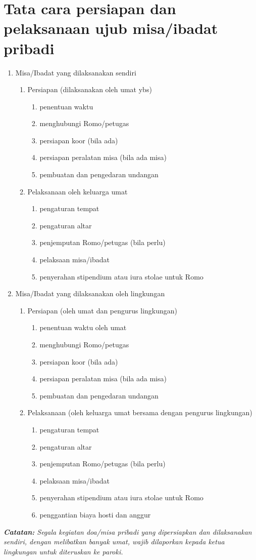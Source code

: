\section{Tata cara persiapan dan pelaksanaan ujub misa/ibadat pribadi}
\begin{enumerate}
\item Misa/Ibadat yang dilaksanakan sendiri
	\begin{enumerate}
	\item Persiapan (dilaksanakan oleh umat ybs)
			\begin{enumerate}
			\item penentuan waktu
			\item menghubungi Romo/petugas
			\item persiapan koor (bila ada)
			\item persiapan peralatan misa (bila ada misa)
			\item pembuatan dan pengedaran undangan
			\end{enumerate}
	\item Pelaksanaan oleh keluarga umat
			\begin{enumerate}
			\item pengaturan tempat
			\item pengaturan altar
			\item penjemputan Romo/petugas (bila perlu)
			\item pelaksaan misa/ibadat
			\item penyerahan stipendium atau iura stolae untuk Romo
			\end{enumerate}
	\end{enumerate}
\item Misa/Ibadat yang dilaksanakan oleh lingkungan
	\begin{enumerate}
	\item Persiapan (oleh umat dan pengurus lingkungan)
			\begin{enumerate}
			\item penentuan waktu oleh umat
			\item menghubungi Romo/petugas
			\item persiapan koor (bila ada)
			\item persiapan peralatan misa (bila ada misa)
			\item pembuatan dan pengedaran undangan
			\end{enumerate}
	\item Pelaksanaan (oleh keluarga umat bersama dengan pengurus lingkungan)
			\begin{enumerate}
			\item pengaturan tempat
			\item pengaturan altar
			\item penjemputan Romo/petugas (bila perlu)
			\item pelaksaan misa/ibadat
			\item penyerahan stipendium atau iura stolae untuk Romo
			\item penggantian biaya hosti dan anggur
			\end{enumerate}
	\end{enumerate}
\end{enumerate}

{\it {\bf Catatan:} Segala kegiatan doa/misa pribadi yang dipersiapkan dan dilaksanakan sendiri, dengan melibatkan banyak umat, wajib dilaporkan kepada ketua lingkungan untuk diteruskan ke paroki.}